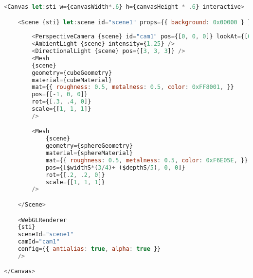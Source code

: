 \begin{lstlisting}[caption={Example of a SveltThree setup},label=sveltthreesetup, language=javascript]
<Canvas let:sti w={canvasWidth*.6} h={canvasHeight * .6} interactive>

    <Scene {sti} let:scene id="scene1" props={{ background: 0x00000 } } >
        
        <PerspectiveCamera {scene} id="cam1" pos={[0, 0, 0]} lookAt={[0, 0, 0]} />
        <AmbientLight {scene} intensity={1.25} />
        <DirectionalLight {scene} pos={[3, 3, 3]} />
        <Mesh
        {scene}
        geometry={cubeGeometry}
        material={cubeMaterial}
        mat={{ roughness: 0.5, metalness: 0.5, color: 0xFF8001, }}
        pos={[-1, 0, 0]}
        rot={[.3, .4, 0]}
        scale={[1, 1, 1]} 
        />

        <Mesh
            {scene}
            geometry={sphereGeometry}
            material={sphereMaterial}
            mat={{ roughness: 0.5, metalness: 0.5, color: 0xF6E05E, }}
            pos={[$widthS*(3/4)+ ($depthS/5), 0, 0]}
            rot={[.2, .2, 0]}
            scale={[1, 1, 1]} 
        />

    </Scene>

    <WebGLRenderer
    {sti}
    sceneId="scene1"
    camId="cam1"
    config={{ antialias: true, alpha: true }} 
    />

</Canvas>
\end{lstlisting}

































